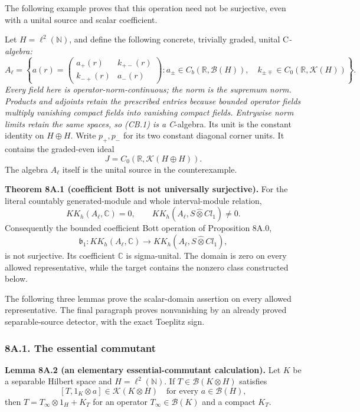 \documentclass[
  11pt,
]{article}
\begin{document}
The following example proves that this operation need not be surjective,
even with a unital source and scalar coefficient.

Let \(H=\ell^2(\mathbb N)\), and define the following concrete,
trivially graded, unital C\emph{-algebra: \[
 A_\ell=\left\{
 a(r)=\begin{pmatrix}a_+(r)&k_{+-}(r)\\k_{-+}(r)&a_-(r)\end{pmatrix}:
 a_\pm\in C_b(\mathbb R,\mathcal B(H)),\quad
 k_{\pm\mp}\in C_0(\mathbb R,\mathcal K(H))
 \right\}.
 \tag{CB.1}
\] Every field here is operator-norm-continuous; the norm is the
supremum norm. Products and adjoints retain the prescribed entries
because bounded operator fields multiply vanishing compact fields into
vanishing compact fields. Entrywise norm limits retain the same spaces,
so (CB.1) is a C}-algebra. Its unit is the constant identity on
\(H\oplus H\). Write \(p_+,p_-\) for its two constant diagonal corner
units. It contains the graded-even ideal \[
 J=C_0(\mathbb R,\mathcal K(H\oplus H)).
 \tag{CB.2}
\] The algebra \(A_\ell\) itself is the unital source in the
counterexample.

\textbf{Theorem 8A.1 (coefficient Bott is not universally surjective).}
For the literal countably generated-module and whole interval-module
relation, \[
 KK_h(A_\ell,\mathbb C)=0,
 \qquad KK_h(A_\ell,S\widehat\otimes Cl_1)\ne0.
 \tag{CB.3}
\] Consequently the bounded coefficient Bott operation of Proposition
8A.0, \[
 \mathfrak b_1:KK_h(A_\ell,\mathbb C)
       \longrightarrow KK_h(A_\ell,S\widehat\otimes Cl_1),
 \tag{CB.4}
\] is not surjective. Its coefficient \(\mathbb C\) is sigma-unital. The
domain is zero on every allowed representative, while the target
contains the nonzero class constructed below.

The following three lemmas prove the scalar-domain assertion on every
allowed representative. The final paragraph proves nonvanishing by an
already proved separable-source detector, with the exact Toeplitz sign.

\subsubsection{8A.1. The essential
commutant}\label{a.1.-the-essential-commutant}

\textbf{Lemma 8A.2 (an elementary essential-commutant calculation).} Let
\(K\) be a separable Hilbert space and \(H=\ell^2(\mathbb N)\). If
\(T\in\mathcal B(K\otimes H)\) satisfies \[
 [T,1_K\otimes a]\in\mathcal K(K\otimes H)
 \quad\text{for every }a\in\mathcal B(H),
 \tag{CB.0}
\] then \(T=T_\infty\otimes1_H+K_T\) for an operator
\(T_\infty\in\mathcal B(K)\) and a compact \(K_T\).
\end{document}
